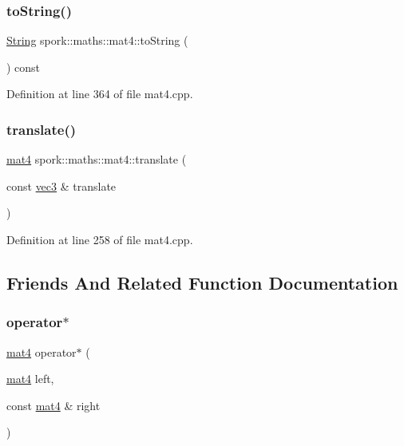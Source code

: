 \subsubsection{\texorpdfstring{to\+String()}{toString()}}
{\footnotesize\ttfamily \hyperlink{my_string_8h_afbeda3fd1bdc8c37d01bdf9f5c8274ff}{String} spork\+::maths\+::mat4\+::to\+String (\begin{DoxyParamCaption}{ }\end{DoxyParamCaption}) const}



Definition at line 364 of file mat4.\+cpp.

\mbox{\label{structspork_1_1maths_1_1mat4_a7a212d97ca3807e61d6a0aa7df904b35}} 
\subsubsection{\texorpdfstring{translate()}{translate()}}
{\footnotesize\ttfamily \hyperlink{structspork_1_1maths_1_1mat4}{mat4} spork\+::maths\+::mat4\+::translate (\begin{DoxyParamCaption}\item[{const \hyperlink{structspork_1_1maths_1_1vec3}{vec3} \&}]{translate }\end{DoxyParamCaption})\hspace{0.3cm}{\ttfamily [static]}}



Definition at line 258 of file mat4.\+cpp.



\subsection{Friends And Related Function Documentation}
\mbox{\label{structspork_1_1maths_1_1mat4_aec96623f8535f2451a1cfef2b9f56e29}} 
\subsubsection{\texorpdfstring{operator$\ast$}{operator*}\hspace{0.1cm}{\footnotesize\ttfamily [1/3]}}
{\footnotesize\ttfamily \hyperlink{structspork_1_1maths_1_1mat4}{mat4} operator$\ast$ (\begin{DoxyParamCaption}\item[{\hyperlink{structspork_1_1maths_1_1mat4}{mat4}}]{left,  }\item[{const \hyperlink{structspork_1_1maths_1_1mat4}{mat4} \&}]{right }\end{DoxyParamCaption})\hspace{0.3cm}{\ttfamily [friend]}}



